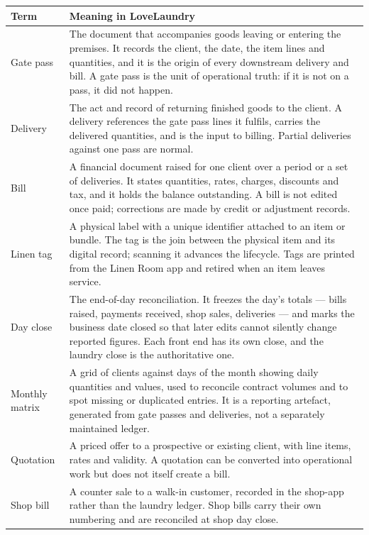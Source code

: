 \documentclass[11pt,a4paper,oneside]{book}
\begin{document}
\begin{center}\small
\begin{tabularx}{\linewidth}{|X|X|}
\hline
\rowcolor{lightgrey}
\textbf{Term} & \textbf{Meaning in LoveLaundry} \\ \hline
Gate pass & The document that accompanies goods leaving or entering the premises. It records the client, the date, the item lines and quantities, and it is the origin of every downstream delivery and bill. A gate pass is the unit of operational truth: if it is not on a pass, it did not happen. \\ \hline
Delivery & The act and record of returning finished goods to the client. A delivery references the gate pass lines it fulfils, carries the delivered quantities, and is the input to billing. Partial deliveries against one pass are normal. \\ \hline
Bill & A financial document raised for one client over a period or a set of deliveries. It states quantities, rates, charges, discounts and tax, and it holds the balance outstanding. A bill is not edited once paid; corrections are made by credit or adjustment records. \\ \hline
Linen tag & A physical label with a unique identifier attached to an item or bundle. The tag is the join between the physical item and its digital record; scanning it advances the lifecycle. Tags are printed from the Linen Room app and retired when an item leaves service. \\ \hline
Day close & The end-of-day reconciliation. It freezes the day's totals — bills raised, payments received, shop sales, deliveries — and marks the business date closed so that later edits cannot silently change reported figures. Each front end has its own close, and the laundry close is the authoritative one. \\ \hline
Monthly matrix & A grid of clients against days of the month showing daily quantities and values, used to reconcile contract volumes and to spot missing or duplicated entries. It is a reporting artefact, generated from gate passes and deliveries, not a separately maintained ledger. \\ \hline
Quotation & A priced offer to a prospective or existing client, with line items, rates and validity. A quotation can be converted into operational work but does not itself create a bill. \\ \hline
Shop bill & A counter sale to a walk-in customer, recorded in the shop-app rather than the laundry ledger. Shop bills carry their own numbering and are reconciled at shop day close. \\ \hline

\end{tabularx}
\end{center}
\end{document}

